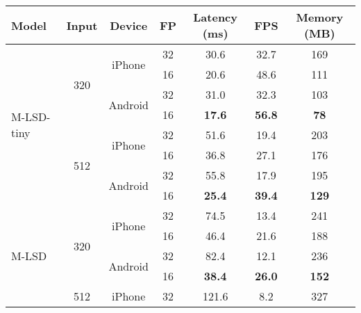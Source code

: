 \documentclass[letterpaper]{article} \usepackage{aaai22}  \usepackage{times}  \usepackage{helvet}  \usepackage{courier}  \usepackage[hyphens]{url}  \usepackage{graphicx} \urlstyle{rm} \def\UrlFont{\rm}  \usepackage{natbib}  \usepackage{caption} \DeclareCaptionStyle{ruled}{labelfont=normalfont,labelsep=colon,strut=off} \frenchspacing  \setlength{\pdfpagewidth}{8.5in}  \setlength{\pdfpageheight}{11in}  \usepackage{algorithm}
\begin{document}
\begin{table}[t!]
\centering
\begin{adjustbox}{width=1.0\columnwidth,center}
\begin{tabular}{lcccccc}
\toprule
Model                       & Input                & Device                   & FP & Latency (ms) & FPS  & Memory (MB) \\
\midrule
\multirow{8}{*}{M-LSD-tiny} & \multirow{4}{*}{320} & \multirow{2}{*}{iPhone}  & 32 & 30.6         & 32.7 & 169         \\
                            &                      &                          & 16 & 20.6         & 48.6 & 111         \\ \cline{3-7} 
                            &                      & \multirow{2}{*}{Android} & 32 & 31.0         & 32.3 & 103         \\
                            &                      &                          & 16 & \textbf{17.6}         & \textbf{56.8} & \textbf{78}          \\ \cline{2-7} 
                            & \multirow{4}{*}{512} & \multirow{2}{*}{iPhone}  & 32 & 51.6         & 19.4 & 203         \\
                            &                      &                          & 16 & 36.8         & 27.1 & 176         \\ \cline{3-7} 
                            &                      & \multirow{2}{*}{Android} & 32 & 55.8         & 17.9 & 195         \\
                            &                      &                          & 16 & \textbf{25.4}         & \textbf{39.4} & \textbf{129}         \\
\midrule
\multirow{8}{*}{M-LSD}      & \multirow{4}{*}{320} & \multirow{2}{*}{iPhone}  & 32 & 74.5         & 13.4 & 241         \\
                            &                      &                          & 16 & 46.4         & 21.6 & 188         \\ \cline{3-7} 
                            &                      & \multirow{2}{*}{Android} & 32 & 82.4         & 12.1 & 236         \\
                            &                      &                          & 16 & \textbf{38.4}         & \textbf{26.0} & \textbf{152}         \\ \cline{2-7} 
                            & \multirow{4}{*}{512} & \multirow{2}{*}{iPhone}  & 32 & 121.6        & 8.2  & 327         \\

\end{tabular}
\end{adjustbox}
\end{table}
\end{document}
